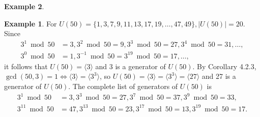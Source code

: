 \documentclass{article}
\newtheorem{corollary}{Corollary}[theorem]
\theoremstyle{definition}
\newtheorem{example}{Example}[section]
\begin{document}
\begin{example}
    \noindent{}
    
    \begin{example}
        For $U(50) = \{1,3,7,9,11,13,17,19,\dots,47,49\}, |U(50)|=20$. Since
        \begin{align*}
            3^1 \bmod{50} &= 3, 3^2\bmod50=9, 3^3\bmod50=27, 3^4\bmod50=31, \dots, \\
            3^0\bmod50 &= 1, 3^{-1}\bmod50=3^{19}\bmod50=17, \dots,
        \end{align*}
        it follows that $U(50)=\langle3\rangle$ and 3 is a generator of $U(50)$. By Corollary 4.2.3, $\gcd(50,3)=1 \iff \langle3\rangle = \langle3^3\rangle$, so $U(50)=\langle3\rangle=\langle3^3\rangle=\langle27\rangle$ and 27 is a generator of $U(50)$. The complete list of generators of $U(50)$ is
        \begin{align*}
            3^1\bmod50 &= 3, 3^3\bmod50=27, 3^7\bmod50=37, 3^9\bmod50=33, \\ 
            3^{11}\bmod50 &= 47, 3^{13}\bmod50=23, 3^{17}\bmod50=13, 3^{19}\bmod50=17.
        \end{align*}
    \end{example}
    
    \noindent{}
\end{example}
\end{document}
